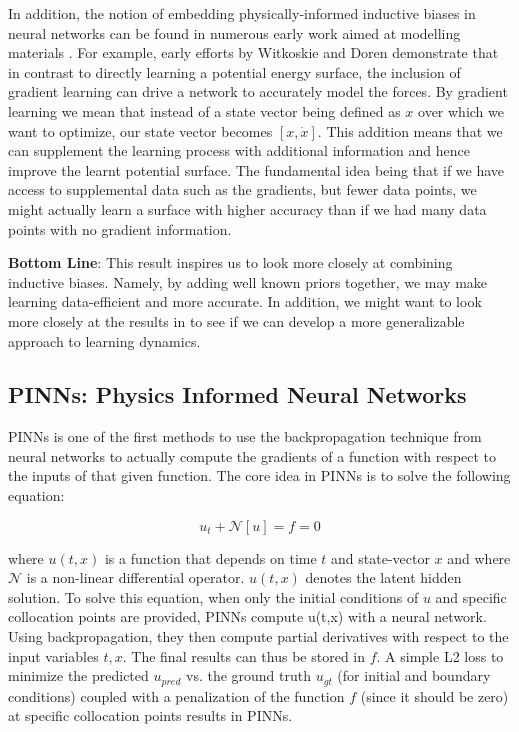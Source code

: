 \documentclass{article}
\begin{document}
In addition, the notion of embedding physically-informed inductive biases in neural networks can be found in numerous early work aimed at modelling materials \cite{witkoskie_neural_2005, pukrittayakamee_simultaneous_2009, smith_ani-1_2017, rupp_fast_2012, yao_tensormol-01_2018}. For example, early efforts by Witkoskie and Doren \cite{witkoskie_neural_2005} demonstrate that in contrast to directly learning a potential energy surface, the inclusion of gradient learning can drive a network to accurately model the forces. By gradient learning we mean that instead of a state vector being defined as $x$ over which we want to optimize, our state vector becomes $[x,\dot{x}]$. This addition means that we can supplement the learning process with additional information and hence improve the learnt potential surface. The fundamental idea being that if we have access to supplemental data such as the gradients, but fewer data points, we might actually learn a surface with higher accuracy than if we had many data points with no gradient information. 

\textbf{Bottom Line}: This result inspires us to look more closely at combining inductive biases. Namely, by adding well known priors together, we may make learning data-efficient and more accurate. In addition, we might want to look more closely at the results in \cite{howse_gradient_1996} to see if we can develop a more generalizable approach to learning dynamics.

\subsection{PINNs: Physics Informed Neural Networks}

PINNs is one of the first methods to use the backpropagation technique from neural networks to actually compute the gradients of a function with respect to the inputs of that given function. The core idea in PINNs is to solve the following equation:

\begin{equation}
 u_t + \mathcal{N}[u] = f = 0
\end{equation}

where $u(t,x)$ is a function that depends on time $t$ and state-vector $x$ and where $\mathcal{N}$ is a non-linear differential operator. $u(t,x)$ denotes the latent hidden solution. To solve this equation, when only the initial conditions of $u$ and specific collocation points are provided, PINNs compute u(t,x) with a neural network. Using backpropagation, they then compute partial derivatives with respect to the input variables $t,x$. The final results can thus be stored in $f$. A simple L2 loss to minimize the predicted $u_{pred}$ vs. the ground truth $u_{gt}$ (for initial and boundary conditions) coupled with a penalization of the function $f$ (since it should be zero) at specific collocation points results in PINNs.
\end{document}
